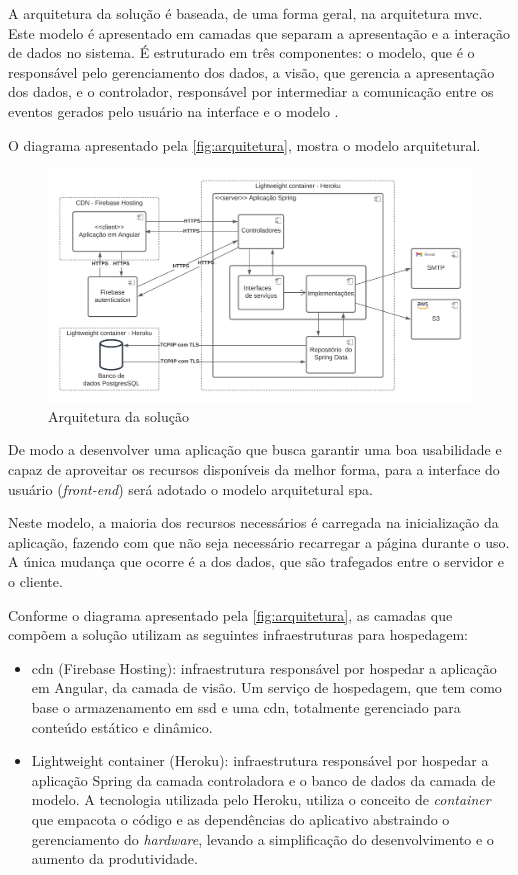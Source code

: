 \documentclass[
    12pt,               %
    openright,          %
    oneside,
    a4paper,            %
    english,            %
    brazil              %
    ]{ifsp-spo-inf-ctds} %
\begin{document}
A arquitetura da solução é baseada, de uma forma geral, na arquitetura \ac{mvc}. Este modelo é apresentado em camadas que separam a apresentação e a interação de dados no sistema. É estruturado em três componentes: o modelo, que é o responsável pelo gerenciamento dos dados, a visão, que gerencia a apresentação dos dados, e o controlador, responsável por intermediar a comunicação entre os eventos gerados pelo usuário na interface e o modelo \cite{engenharia-de-software:2018}.

O diagrama apresentado pela \autoref{fig:arquitetura}, mostra o modelo arquitetural.

\begin{figure}[htb]
    \centering
	\includegraphics[width=16cm]{imagens/Arquitetura.png}
	\caption{\label{fig:arquitetura} Arquitetura da solução}
\end{figure}
 
 
De modo a desenvolver uma aplicação que busca garantir uma boa usabilidade e capaz de aproveitar os recursos disponíveis da melhor forma, para a interface do usuário (\textit{\gls{front-end}}) será adotado o modelo arquitetural \ac{spa}. 


Neste modelo, a maioria dos recursos necessários é carregada na inicialização da aplicação, fazendo com que não seja necessário recarregar a página durante o uso. A única mudança que ocorre é a dos dados, que são trafegados entre o servidor e o cliente.


Conforme o diagrama apresentado pela \autoref{fig:arquitetura}, as camadas que compõem a solução utilizam as seguintes infraestruturas para hospedagem:
\begin{itemize}
\item \ac{cdn} (Firebase Hosting): infraestrutura responsável por hospedar a aplicação em Angular, da camada de visão. Um serviço de hospedagem, que tem como base o armazenamento em \ac{ssd} e uma \ac{cdn}, totalmente gerenciado para conteúdo estático e dinâmico.
\item  Lightweight container (Heroku): infraestrutura responsável por hospedar a aplicação Spring da camada controladora e o banco de dados da camada de modelo. A tecnologia utilizada pelo Heroku, utiliza o conceito de \textit{\gls{container}} que empacota o código e as dependências do aplicativo abstraindo o gerenciamento do \textit{\gls{hardware}}, levando a simplificação do desenvolvimento e o aumento da produtividade.
\end{itemize}
\end{document}

